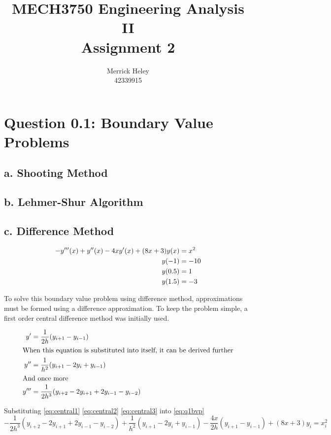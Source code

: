 \documentclass[a4paper,11pt,titlepage]{article}
\title{
MECH3750 Engineering Analysis II \\ 
Assignment 2
}
\author{
Merrick Heley\\
42339915
}
\begin{document}
\maketitle

\section*{Question 0.1: Boundary Value Problems}
\subsection*{a. Shooting Method}

\subsection*{b. Lehmer-Shur Algorithm}

\subsection*{c. Difference Method}

\begin{align}
-y'''(x) + y''(x) - 4xy'(x) + (8x + 3)y(x) &= x^2 \label{eq:q1bvp}\\
y(-1) & = -10 \notag\\
y(0.5) & = 1 \notag\\
y(1.5) & = -3 \notag
\end{align}

To solve this boundary value problem using difference method, approximations 
must be formed using a difference approximation. To keep the problem simple, a 
first order central difference method was initially used.

\begin{align}
y' & = \frac{1}{2h}(y_{i+1} - y_{i-1}) \label{eq:central1}\\
\intertext{When this equation is substituted into itself, it can be derived 
            further}
y'' & = \frac{1}{h^2}(y_{i+1} - 2y_i + y_{i-1}) \label{eq:central2}\\
\intertext{And once more}
y''' & = \frac{1}{2h^3}(y_{i+2} - 2y_{i+1} + 2y_{i-1} - y_{i-2}) 
            \label{eq:central3}
\end{align}

Substituting \eqref{eq:central1} \eqref{eq:central2} 
            \eqref{eq:central3} into \eqref{eq:q1bvp} \\
\begin{equation*}
-\frac{1}{2h^3}(y_{i+2} - 2y_{i+1} + 2y_{i-1} - y_{i-2}) 
+ \frac{1}{h^2}(y_{i+1} - 2y_i + y_{i-1})
- \frac{4x}{2h}(y_{i+1} - y_{i-1})
+ (8x + 3)y_i
= x_i^2
\end{equation*}
\end{document}
